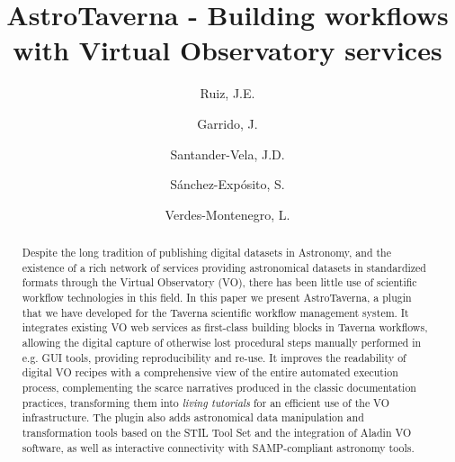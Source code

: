 \documentclass[final,authoryear,5p,times,twocolumn]{elsarticle}
\begin{document}
\begin{frontmatter}



\title{AstroTaverna - Building workflows with Virtual Observatory services}


\author[IAA]{Ruiz, J.E.}

\author[IAA]{Garrido, J.}

\author[IAA]{Santander-Vela, J.D.}
\author[IAA]{S\'anchez-Exp\'osito, S.}
\author[IAA]{Verdes-Montenegro, L.}

\address[IAA]{Instituto de Astrof\'isica de Andaluc\'ia - CSIC \\Glorieta de la Astronom\'ia s/n, 18008 Granada, Spain}


\begin{abstract}
Despite the long tradition of publishing digital datasets in Astronomy, and the existence of a rich network of services providing astronomical datasets in standardized formats through the Virtual Observatory (VO), there has been little use of scientific workflow technologies in this field. In this paper we present AstroTaverna, a plugin that we have developed for the Taverna scientific workflow management system. It integrates existing VO web services as first-class building blocks in Taverna workflows, allowing the digital capture of otherwise lost procedural steps manually performed in e.g. GUI tools, providing reproducibility and re-use. It improves the readability of digital VO recipes with a comprehensive view of the entire automated execution process, complementing the scarce narratives produced in the classic documentation practices, transforming them into \textit{living tutorials} for an efficient use of the VO infrastructure. The plugin also adds astronomical data manipulation and transformation tools based on the STIL Tool Set and the integration of Aladin VO software, as well as interactive connectivity with SAMP-compliant astronomy tools. 
\end{abstract}


\end{frontmatter}
\end{document}
